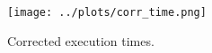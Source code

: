 \documentclass[a4paper,11pt]{article}
\begin{document}
\begin{figure}[!h]
  \caption{Corrected execution times.}
  \label{corr}
  \texttt{[image: ../plots/corr\_time.png]}
\end{figure}

\clearpage

\begin{comment}
\paragraph\noindent\textbf{Overview of the linear program}
\begin{itemize}
\renewcommand{\labelitemi}{$\bullet$}
\item Load image from disk
\item Calculate average RGB sum
\item Calculate output image
\item Write image to disk
\end{itemize}

\begin{figure}[!h]
  \caption{Run times related to number of cores for the different images.}
  \label{runtime_vs_cores}
  \texttt{[image: ../plots/runtimevscoresthres.png]}
\end{figure}

\begin{table}[h!]
  \caption{$MPixels/Second$ when running with different amount of threads and on different data.}
  \label{mpixelspersecond}
  \begin{tabular}[h]{|l|l|l|l|l|l|}
    \hline
                      & 1      & 2      & 4      & 8      & 16\\
    \hline
    im1.ppm           & 135.41 & 183.31 & 184.94 & 68.89  & 21.77\\ 
    im2.ppm           & 150.01 & 209.17 & 274.71 & 201.65 & 63.15\\ 
    im3.ppm           & 146.25 & 209.72 & 274.44 & 275.62 & 138.23\\ 
    im4.ppm           & 145.07 & 212.56 & 286.41 & 332.90 & 297.42\\
    \hline
  \end{tabular}
\end{table}

\cite{fenwick}

\clearpage
\begin{thebibliography}{9}
  \bibitem{fenwick}
    Binary Indexed Trees,
    \emph{Algortihmist}.\\
    \url{http://community.topcoder.com/tc?module=Static\&d1=tutorials\&d2=binaryIndexedTrees}
  \bibitem{ppm}
    Mark Nelson,
    \emph{Arithmetic Coding + Statistical Modeling = Data Compression}, 1991.\\
    \url{http://marknelson.us/1991/02/01/arithmetic-coding-statistical-modeling-data-compression/}
  \bibitem{ppmc}
    PPM
    \url{http://www.cs.ucf.edu/courses/cap5015/ppm.pdf}


\end{comment}
\end{document}
